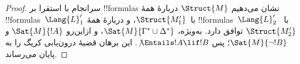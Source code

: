 \documentclass[../../../include/open-logic-section]{subfiles}
\begin{document}
\begin{proof}
سرانجام با استقرا بر !!{formula}s نشان می‌دهیم $\Struct{M}$ دربارهٔ
همهٔ !!{formula}s~$\Lang{L}'_1$ با~$\Struct{M'_1}$، و دربارهٔ همهٔ
!!{formula}s~$\Lang{L}'_2$ با~$\Struct{M'_2}$ توافق دارد. به‌ویژه،
$\Sat{M}{\Gamma^* \cup \Delta^*}$، و ازاین‌رو $\Sat{M}{!A}$ و
$\Sat{M}{\lnot!B}$؛ پس $\not\Entails !A \lif !B$. این برهان قضیهٔ
درون‌یابی کریگ را به پایان می‌رساند.
\end{proof}
\end{document}

